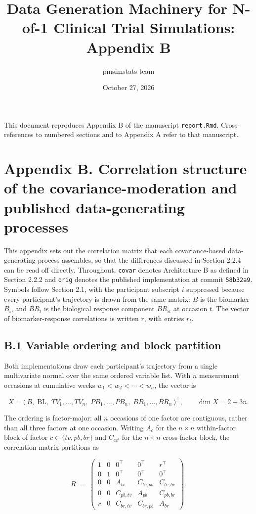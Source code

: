 \documentclass[
  11pt,
]{article}
\title{Data Generation Machinery for N-of-1 Clinical Trial Simulations: Appendix B}
\author{pmsimstats team}
\date{October 27, 2026}
\begin{document}
\maketitle

{
\setcounter{tocdepth}{2}
\tableofcontents
}
This document reproduces Appendix B of the manuscript
\texttt{report.Rmd}. Cross-references to numbered sections and to
Appendix A refer to that manuscript.

\section{Appendix B. Correlation structure of the covariance-moderation
and published data-generating processes}

This appendix sets out the correlation matrix that each covariance-based
data-generating process assembles, so that the differences discussed in
Section 2.2.4 can be read off directly. Throughout, \texttt{covar}
denotes Architecture B as defined in Section 2.2.2 and \texttt{orig}
denotes the published implementation at commit \texttt{58b32a9}.
Symbols follow Section 2.1, with the participant subscript \(i\)
suppressed because every participant's trajectory is drawn from the
same matrix: \(B\) is the biomarker \(B_i\), and \(BR_t\) is the biological
response component \(BR_{it}\) at occasion \(t\). The vector of
biomarker-response correlations is written \(r\), with entries \(r_t\).

\subsection{B.1 Variable ordering and block partition}

Both implementations draw each participant's trajectory from a single
multivariate normal over the same ordered variable list. With \(n\)
measurement occasions at cumulative weeks
\(w_1 < w_2 < \cdots < w_n\), the vector is

\[
X = \bigl(\,B,\; \mathrm{BL},\;
TV_1,\dots,TV_n,\;
PB_1,\dots,PB_n,\;
BR_1,\dots,BR_n \,\bigr)^{\!\top},
\qquad \dim X = 2 + 3n .
\]

The ordering is factor-major: all \(n\) occasions of one factor are
contiguous, rather than all three factors at one occasion. Writing
\(A_c\) for the \(n \times n\) within-factor block of factor
\(c \in \{tv, pb, br\}\) and \(C_{cc'}\) for the \(n \times n\)
cross-factor block, the correlation matrix partitions as

\[
R \;=\;
\begin{pmatrix}
1 & 0 & 0^{\top} & 0^{\top} & r^{\top} \\[2pt]
0 & 1 & 0^{\top} & 0^{\top} & 0^{\top} \\[2pt]
0 & 0 & A_{tv}   & C_{tv,pb} & C_{tv,br} \\[2pt]
0 & 0 & C_{pb,tv} & A_{pb}   & C_{pb,br} \\[2pt]
r & 0 & C_{br,tv} & C_{br,pb} & A_{br}
\end{pmatrix}.
\]
\end{document}
